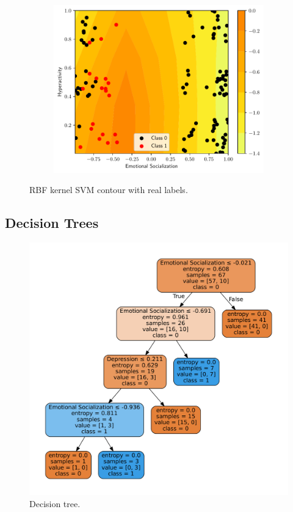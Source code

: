 \documentclass[conference]{IEEEtran}
\theoremstyle{definition}
\theoremstyle{remark}
\theoremstyle{remark}
\begin{document}
\begin{figure}
\begin{subfigure}[b]{0.32\textwidth}
        \includegraphics[width=\textwidth]{figs/svm-rbf-contour-2-5.pdf}
        \caption{}
    \end{subfigure}
    \caption{RBF kernel SVM contour with real labels.}
    \label{fig:SVM-rbf}
\end{figure}

\subsection{Decision Trees}
\begin{figure}
    \includegraphics[width=\columnwidth]{figs/tree-graph.pdf}
    \caption{Decision tree.}
    \label{fig:dt}
\end{figure}
\end{document}
